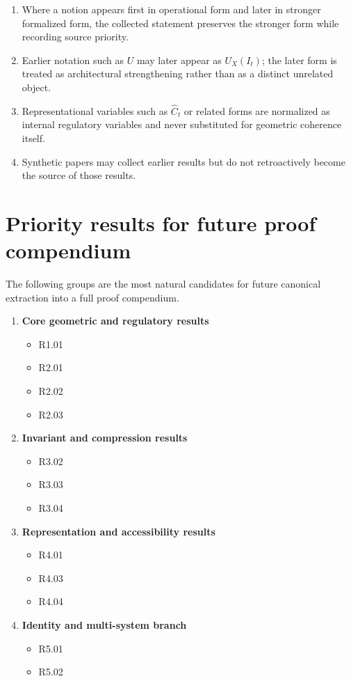 \documentclass[12pt]{article}
\begin{document}
	\begin{enumerate}[leftmargin=2em]
		\item Where a notion appears first in operational form and later in stronger formalized form,
		the collected statement preserves the stronger form while recording source priority.
		\item Earlier notation such as $U$ may later appear as $U_X(I_t)$; the later form is treated
		as architectural strengthening rather than as a distinct unrelated object.
		\item Representational variables such as $\widehat{C}_t$ or related forms are normalized as
		internal regulatory variables and never substituted for geometric coherence itself.
		\item Synthetic papers may collect earlier results but do not retroactively become the source
		of those results.
	\end{enumerate}
	
	\section{Priority results for future proof compendium}
	
	The following groups are the most natural candidates for future canonical extraction into a
	full proof compendium.
	
	\begin{enumerate}[leftmargin=2em]
		\item \textbf{Core geometric and regulatory results}
		\begin{itemize}[leftmargin=2em]
			\item R1.01
			\item R2.01
			\item R2.02
			\item R2.03
		\end{itemize}
		
		\item \textbf{Invariant and compression results}
		\begin{itemize}[leftmargin=2em]
			\item R3.02
			\item R3.03
			\item R3.04
		\end{itemize}
		
		\item \textbf{Representation and accessibility results}
		\begin{itemize}[leftmargin=2em]
			\item R4.01
			\item R4.03
			\item R4.04
		\end{itemize}
		
		\item \textbf{Identity and multi-system branch}
		\begin{itemize}[leftmargin=2em]
			\item R5.01
			\item R5.02
		\end{itemize}
	\end{enumerate}
	
\end{document}
